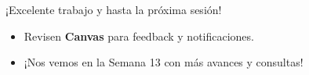 \documentclass[10pt]{beamer}
\begin{document}
\begin{frame}
  \Huge{\centerline{¡Excelente trabajo y hasta la próxima sesión!}}
  \vspace{0.4cm}
  \normalsize
  \begin{itemize}
    \item Revisen \textbf{Canvas} para feedback y notificaciones.
    \item ¡Nos vemos en la Semana 13 con más avances y consultas!
  \end{itemize}
\end{frame}
\end{document}
